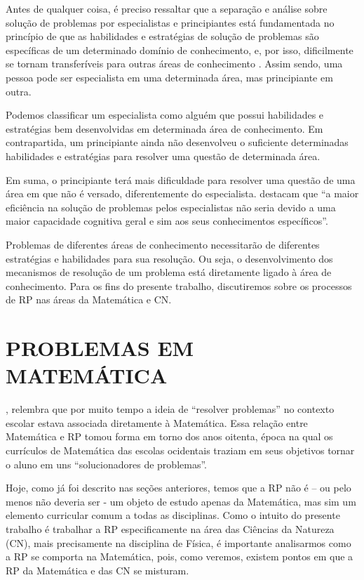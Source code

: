 Antes de qualquer coisa, é preciso ressaltar que a separação e análise sobre solução de problemas por especialistas e principiantes está fundamentada no princípio de que as habilidades e estratégias de solução de problemas são específicas de um determinado domínio de conhecimento, e, por isso, dificilmente se tornam transferíveis para outras áreas de conhecimento \cite{Echeverria1998}. Assim sendo, uma pessoa pode ser especialista em uma determinada área, mas principiante em outra. 

Podemos classificar um especialista como alguém que possui habilidades e estratégias bem desenvolvidas em determinada área de conhecimento. Em contrapartida, um principiante ainda não desenvolveu o suficiente determinadas habilidades e estratégias para resolver uma questão de determinada área. 

Em suma, o principiante terá mais dificuldade para resolver uma questão de uma área em que não é versado, diferentemente do especialista.  destacam que “a maior eficiência na solução de problemas pelos especialistas não seria devido a uma maior capacidade cognitiva geral e sim aos seus conhecimentos específicos”. 

Problemas de diferentes áreas de conhecimento necessitarão de diferentes estratégias e habilidades para sua resolução. Ou seja, o desenvolvimento dos mecanismos de resolução de um problema está diretamente ligado à área de conhecimento. Para os fins do presente trabalho, discutiremos sobre os processos de RP nas áreas da Matemática e CN. 
\section{PROBLEMAS EM MATEMÁTICA}

, relembra que por muito tempo a ideia de “resolver problemas” no contexto escolar estava associada diretamente à Matemática. Essa relação entre Matemática e RP tomou forma em torno dos anos oitenta, época na qual os currículos de Matemática das escolas ocidentais traziam em seus objetivos tornar o aluno em uns “solucionadores de problemas”. 

Hoje, como já foi descrito nas seções anteriores, temos que a RP não é – ou pelo menos não deveria ser - um objeto de estudo apenas da Matemática, mas sim um elemento curricular comum a todas as disciplinas.  Como o intuito do presente trabalho é trabalhar a RP especificamente na área das Ciências da Natureza (CN), mais precisamente na disciplina de Física, é importante analisarmos como a RP se comporta na Matemática, pois, como veremos, existem pontos em que a RP da Matemática e das CN se misturam. 

